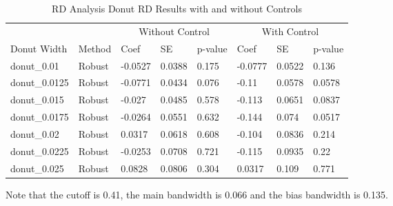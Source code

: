 \begin{table}[ht]
\centering
\caption{RD Analysis Donut RD Results with and without Controls} 
\label{tab:rd_robust_results}
\begin{tabular}{llllllll}
  \hline
 &  & \multicolumn{3}{c}{Without Control} & \multicolumn{3}{c}{With Control} \\
Donut Width & Method & Coef & SE & p-value & Coef & SE & p-value \\ 
  \hline
donut\_0.01 & Robust & -0.0527 & 0.0388 & 0.175 & -0.0777 & 0.0522 & 0.136 \\ 
  donut\_0.0125 & Robust & -0.0771 & 0.0434 & 0.076 & -0.11 & 0.0578 & 0.0578 \\ 
  donut\_0.015 & Robust & -0.027 & 0.0485 & 0.578 & -0.113 & 0.0651 & 0.0837 \\ 
  donut\_0.0175 & Robust & -0.0264 & 0.0551 & 0.632 & -0.144 & 0.074 & 0.0517 \\ 
  donut\_0.02 & Robust & 0.0317 & 0.0618 & 0.608 & -0.104 & 0.0836 & 0.214 \\ 
  donut\_0.0225 & Robust & -0.0253 & 0.0708 & 0.721 & -0.115 & 0.0935 & 0.22 \\ 
  donut\_0.025 & Robust & 0.0828 & 0.0806 & 0.304 & 0.0317 & 0.109 & 0.771 \\ 
   \hline
\end{tabular}

Note that the cutoff is 0.41, the main bandwidth is 0.066 and the bias bandwidth is 0.135.
\end{table}

